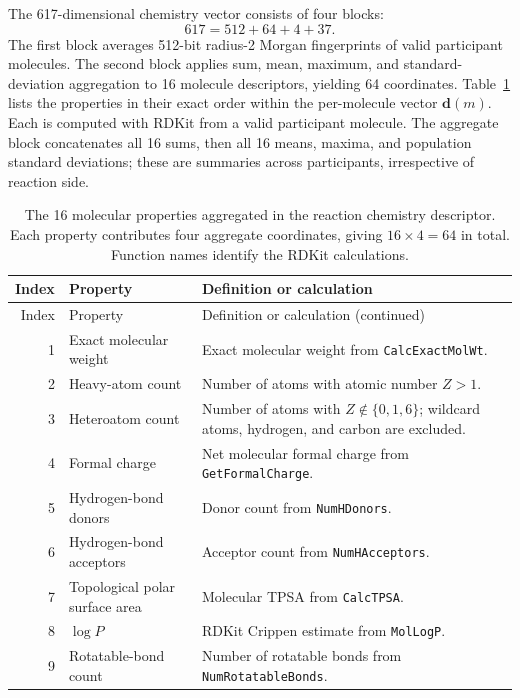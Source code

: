 The 617-dimensional chemistry vector consists of four blocks:
\begin{equation}
  617=512+64+4+37.
\end{equation}
The first block averages 512-bit radius-2 Morgan fingerprints of valid
participant molecules. The second block applies sum, mean, maximum, and
standard-deviation aggregation to 16 molecule descriptors, yielding 64
coordinates. Table~\ref{tab:v4-molecular-properties} lists the properties in
their exact order within the per-molecule vector $\mathbf{d}(m)$. Each is computed
with RDKit from a valid participant molecule. The aggregate block concatenates
all 16 sums, then all 16 means, maxima, and population standard deviations;
these are summaries across participants, irrespective of reaction side.

\begin{longtable}{@{}r>{\raggedright\arraybackslash}p{}>{\raggedright\arraybackslash}p{}@{}}
\caption{The 16 molecular properties aggregated in the reaction chemistry
descriptor. Each property contributes four aggregate coordinates, giving
$16\times4=64$ in total. Function names identify the RDKit calculations.}
\label{tab:v4-molecular-properties}\\
\toprule
Index & Property & Definition or calculation\\
\midrule
\endfirsthead
\toprule
Index & Property & Definition or calculation (continued)\\
\midrule
\endhead
1 & Exact molecular weight & Exact molecular weight from \texttt{CalcExactMolWt}.\\
2 & Heavy-atom count & Number of atoms with atomic number $Z>1$.\\
3 & Heteroatom count & Number of atoms with $Z\notin\{0,1,6\}$; wildcard atoms, hydrogen, and carbon are excluded.\\
4 & Formal charge & Net molecular formal charge from \texttt{GetFormalCharge}.\\
5 & Hydrogen-bond donors & Donor count from \texttt{NumHDonors}.\\
6 & Hydrogen-bond acceptors & Acceptor count from \texttt{NumHAcceptors}.\\
7 & Topological polar surface area & Molecular TPSA from \texttt{CalcTPSA}.\\
8 & $\log P$ & RDKit Crippen estimate from \texttt{MolLogP}.\\
9 & Rotatable-bond count & Number of rotatable bonds from \texttt{NumRotatableBonds}.\\

\end{longtable}
